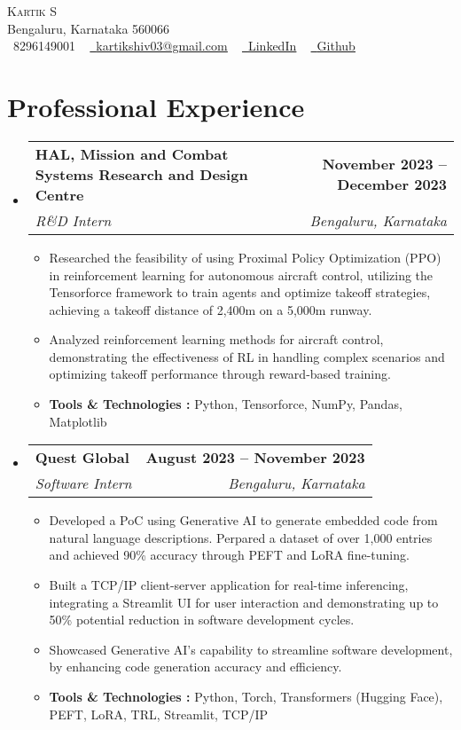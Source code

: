 \documentclass[letterpaper,11pt]{article}
\makeatletter
\newcommand{\resumeItem}[1]{
  \item\small{
    {#1 \vspace{-2pt}}
  }
}
\newcommand{\resumeSubheading}[4]{
  \vspace{-2pt}\item
    \begin{tabular*}{1.0\textwidth}[t]{l@{\extracolsep{\fill}}r}
      \textbf{#1} & \textbf{\small #2} \\
      \textit{\small#3} & \textit{\small #4} \\
    \end{tabular*}\vspace{-7pt}
}
\newcommand{\resumeSubHeadingListStart}{\begin{itemize}[leftmargin=0.0in, label={}]}
\newcommand{\resumeSubHeadingListEnd}{\end{itemize}}
\newcommand{\resumeItemListStart}{\begin{itemize}}
\newcommand{\resumeItemListEnd}{\end{itemize}\vspace{-5pt}}
\makeatother
\begin{document}
\begin{center}
    {\Huge \scshape Kartik S} \\ \vspace{1pt}
    Bengaluru, Karnataka 560066 \\ \vspace{1pt}
    \small \raisebox{-0.1\height}\faPhone\ 8296149001 ~ \href{mailto:kartikshiv03@gmail.com}{\raisebox{-0.2\height}\faEnvelope\  \underline{kartikshiv03@gmail.com}} ~ 
    \href{https://www.linkedin.com/in/kartik26/}{\raisebox{-0.2\height}\faLinkedin\ \underline{LinkedIn}}  ~
    \href{https://github.com/kartik2607}{\raisebox{-0.2\height}\faGithub\ \underline{Github}}
    \vspace{-8pt}
\end{center}

\section{Professional Experience}
  \resumeSubHeadingListStart
    \resumeSubheading
      {\small HAL, Mission and Combat Systems Research and Design Centre}{November 2023 -- December 2023}
      {R\&D Intern}{Bengaluru, Karnataka}
      \resumeItemListStart
        \resumeItem{Researched the feasibility of using Proximal Policy Optimization (PPO) in reinforcement learning for autonomous aircraft control, utilizing the Tensorforce framework to train agents and optimize takeoff strategies, achieving a takeoff distance of 2,400m on a 5,000m runway.}
        \resumeItem{Analyzed reinforcement learning methods for aircraft control, demonstrating the effectiveness of RL in handling complex scenarios and optimizing takeoff performance through reward-based training.}
        \resumeItem{\textbf{Tools \& Technologies :} Python, Tensorforce, NumPy, Pandas, Matplotlib}
      \resumeItemListEnd
    \resumeSubheading
      {\small Quest Global}{August 2023 -- November 2023}
      {Software Intern}{Bengaluru, Karnataka}
      \resumeItemListStart
        \resumeItem{Developed a PoC using Generative AI to generate embedded code from natural language descriptions. Perpared a dataset of over 1,000 entries and achieved 90\% accuracy through PEFT and LoRA fine-tuning.}
        \resumeItem{Built a TCP/IP client-server application for real-time inferencing, integrating a Streamlit UI for user interaction and demonstrating up to 50\% potential reduction in software development cycles.}
        \resumeItem{Showcased Generative AI's capability to streamline software development, by enhancing code generation accuracy and efficiency.}
        \resumeItem{\textbf{Tools \& Technologies :} Python, Torch, Transformers (Hugging Face), PEFT, LoRA, TRL, Streamlit, TCP/IP}
    \resumeItemListEnd
  \resumeSubHeadingListEnd
\vspace{-16pt}
\end{document}
